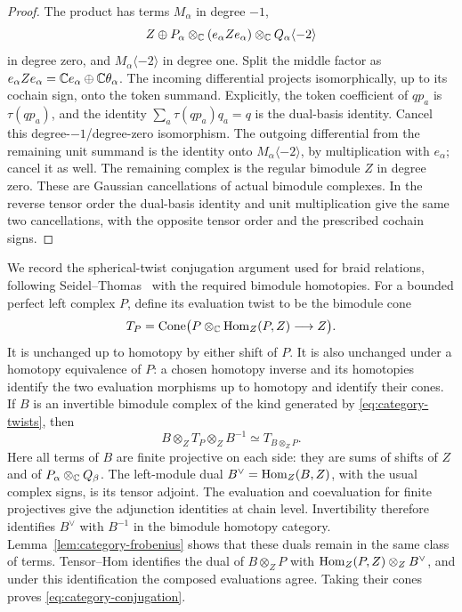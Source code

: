 \begin{proof}
The product has terms $M_\alpha$ in degree $-1$,
\[
 Z\oplus
 P_\alpha\otimes_\mathbb C(e_\alpha Ze_\alpha)
                 \otimes_\mathbb C Q_\alpha\langle-2\rangle
\]
in degree zero, and $M_\alpha\langle-2\rangle$ in degree one.
Split the middle factor as
$e_\alpha Ze_\alpha=\mathbb C e_\alpha\oplus\mathbb C\theta_\alpha$.
The incoming differential projects isomorphically, up to its cochain
sign, onto the token summand. Explicitly, the token coefficient of
$q p_a$ is $\tau(q p_a)$, and the identity
$\sum_a\tau(qp_a)q_a=q$ is the dual-basis identity. Cancel this
degree-$-1$/degree-zero isomorphism. The outgoing differential from
the remaining unit summand is the identity onto
$M_\alpha\langle-2\rangle$, by multiplication with $e_\alpha$;
cancel it as well. The remaining complex is the regular bimodule $Z$
in degree zero. These are Gaussian cancellations of actual bimodule
complexes. In the reverse tensor order the dual-basis identity and
unit multiplication give the same two cancellations, with the
opposite tensor order and the prescribed cochain signs.
\end{proof}

We record the spherical-twist conjugation argument used for braid
relations, following Seidel--Thomas~\cite[Lemma~2.11 and
Propositions~2.12--2.13]{SeidelThomas2001} with the required bimodule
homotopies. For a
bounded perfect left complex $P$, define its evaluation twist to be
the bimodule cone
\begin{equation}
 T_P=\operatorname{Cone}\bigl(P\otimes_\mathbb C\operatorname{Hom}_Z(P,Z)\longrightarrow Z\bigr).
 \label{eq:category-evaluation-twist}
\end{equation}
It is unchanged up to homotopy by either shift of $P$. It is also
unchanged under a homotopy equivalence of $P$: a chosen homotopy
inverse and its homotopies identify the two evaluation morphisms up
to homotopy and identify their cones. If $B$ is an invertible
bimodule complex of the kind generated by
\eqref{eq:category-twists}, then
\begin{equation}
 B\otimes_ZT_P\otimes_ZB^{-1}\simeq T_{B\otimes_ZP}.
 \label{eq:category-conjugation}
\end{equation}
Here all terms of $B$ are finite projective on each side: they are
sums of shifts of $Z$ and of $P_\alpha\otimes_\mathbb C Q_\beta$.
The left-module dual $B^\vee=\operatorname{Hom}_Z(B,Z)$, with the usual complex
signs, is its tensor adjoint. The evaluation and coevaluation for
finite projectives give the adjunction identities at chain level.
Invertibility therefore identifies $B^\vee$ with $B^{-1}$ in the
bimodule homotopy category. Lemma~\ref{lem:category-frobenius} shows
that these duals remain in the same class of terms. Tensor--Hom
identifies the dual of $B\otimes_ZP$ with
$\operatorname{Hom}_Z(P,Z)\otimes_ZB^\vee$, and under this identification the
composed evaluations agree. Taking their cones proves
\eqref{eq:category-conjugation}.


